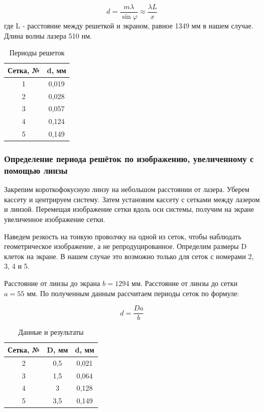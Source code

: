 \documentclass[a4paper, 12pt]{article}
\begin{document}
\begin{equation}
	d = \frac{m \lambda}{\sin \varphi} \approx \frac{\lambda L}{x}
\end{equation}
где L - расстояние между решеткой и экраном, равное 1349 мм в нашем случае. Длина волны лазера 510 нм.

\begin{table}[H]
	\centering
	\begin{tabular}{|c|c|}
	\hline
	\textbf{Сетка, №} & \textbf{d, мм} \\ \hline
	1                 & 0,019         \\ \hline
	2                 & 0,028         \\ \hline
	3                 & 0,057         \\ \hline
	4                 & 0,124         \\ \hline
	5                 & 0,149         \\ \hline
	\end{tabular}
	\caption{Периоды решеток}
	\label{tab:res1}
\end{table}

\subsubsection*{Определение периода решёток по изображению, увеличенному с помощью линзы}

Закрепим короткофокусную линзу на небольшом расстоянии от лазера. Уберем кассету и центрируем систему. Затем установим кассету с сетками между лазером и линзой.
Перемещая изображение сетки вдоль оси системы, получим на экране увеличенное изображение сетки.

Наведем резкость на тонкую проволчку на одной из сеток, чтобы наблюдать геометрическое изображение, а не репродуцированное. Определим размеры D клеток на экране.
В нашем случае это возможно только для сеток с номерами 2, 3, 4 и 5.

Расстояние от линзы до экрана $b = 1294$ мм. Расстояние от линзы до сетки $a = 55$ мм.
По полученным данным рассчитаем периоды сеток по формуле:

\begin{equation}
	d = \frac{Da}{b}
\end{equation}


\begin{table}[H]
	\centering
	\begin{tabular}{|c|c|c|}
	\hline
	\textbf{Сетка, №} & \textbf{D, мм} & \textbf{d, мм} \\ \hline
	2                 & 0,5            & 0,021          \\ \hline
	3                 & 1,5            & 0,064          \\ \hline
	4                 & 3              & 0,128          \\ \hline
	5                 & 3,5            & 0,149          \\ \hline
	\end{tabular}
	\caption{Данные и результаты}
	\label{tab:data2}
	\end{table}
\end{document}
